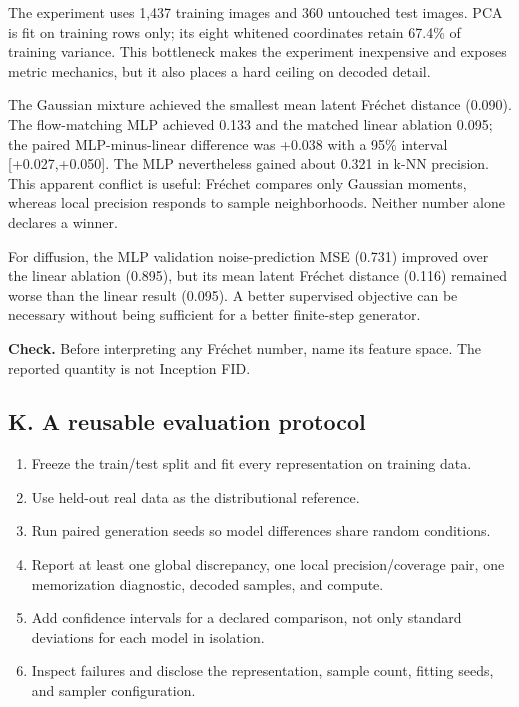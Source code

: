 \documentclass[11pt]{article}
\begin{document}
The experiment uses 1,437 training images and 360 untouched test images. PCA is
fit on training rows only; its eight whitened coordinates retain 67.4\% of
training variance. This bottleneck makes the experiment inexpensive and exposes
metric mechanics, but it also places a hard ceiling on decoded detail.

The Gaussian mixture achieved the smallest mean latent Fr\'echet distance
(0.090). The flow-matching MLP achieved 0.133 and the matched linear ablation
0.095; the paired MLP-minus-linear difference was +0.038 with a 95\% interval
[+0.027,+0.050]. The MLP nevertheless gained about 0.321 in k-NN precision.
This apparent conflict is useful: Fr\'echet compares only Gaussian moments,
whereas local precision responds to sample neighborhoods. Neither number alone
declares a winner.

For diffusion, the MLP validation noise-prediction MSE (0.731) improved over the
linear ablation (0.895), but its mean latent Fr\'echet distance (0.116) remained
worse than the linear result (0.095). A better supervised objective can be
necessary without being sufficient for a better finite-step generator.

\textbf{Check.} Before interpreting any Fr\'echet number, name its feature space.
The reported quantity is not Inception FID.

\subsection*{K. A reusable evaluation protocol}

\begin{enumerate}
\item Freeze the train/test split and fit every representation on training data.
\item Use held-out real data as the distributional reference.
\item Run paired generation seeds so model differences share random conditions.
\item Report at least one global discrepancy, one local precision/coverage pair,
one memorization diagnostic, decoded samples, and compute.
\item Add confidence intervals for a declared comparison, not only standard
deviations for each model in isolation.
\item Inspect failures and disclose the representation, sample count, fitting
seeds, and sampler configuration.
\end{enumerate}
\end{document}
